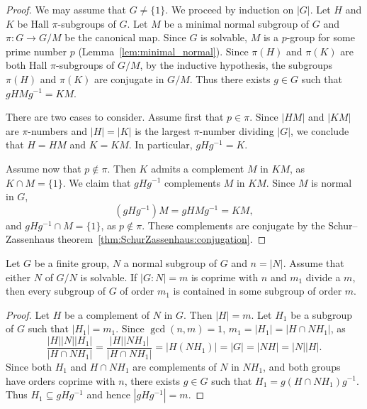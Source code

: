 \begin{proof}
	We may assume that $G\ne\{1\}$. We proceed by induction on $|G|$.  Let $H$
	and $K$ be Hall $\pi$-subgroups of $G$. Let $M$ be a minimal normal subgroup of 
    $G$ and $\pi\colon G\to G/M$ be the canonical map. Since $G$ is solvable, 
	$M$ is a $p$-group for some prime number $p$ (Lemma~\ref{lem:minimal_normal}). 
    Since $\pi(H)$ and $\pi(K)$ are both Hall 
	$\pi$-subgroups of $G/M$, by the inductive hypothesis, 
    the subgroups $\pi(H)$ and $\pi(K)$ are 
	conjugate in $G/M$. Thus there exists $g\in G$ such that $gHMg^{-1}=KM$. 

	There are two cases to consider. Assume first that $p\in\pi$. Since $|HM|$ and 
	$|KM|$ are $\pi$-numbers and $|H|=|K|$ is the largest $\pi$-number dividing $|G|$, 
    we conclude that $H=HM$ and $K=KM$. In particular, $gHg^{-1}=K$. 

	Assume now that $p\not\in\pi$. Then $K$ admits a complement $M$ in 
 	$KM$, as $K\cap M=\{1\}$. We claim that $gHg^{-1}$ complements $M$ in $KM$. Since 
	$M$ is normal in $G$, 
 	\[
	(gHg^{-1})M=gHMg^{-1}=KM,
	\]
	and $gHg^{-1}\cap M=\{1\}$, as $p\not\in\pi$. These complements are conjugate 
    by the Schur--Zassenhaus theorem~\ref{thm:SchurZassenhaus:conjugation}.
\end{proof}

\begin{corollary}
	Let $G$ be a finite group, $N$ a normal subgroup of $G$ and $n=|N|$. 
 	Assume that either $N$ of $G/N$ is solvable. 
    If $|G:N|=m$ is coprime with $n$ and 
    $m_1$ divide a $m$, then every subgroup of $G$ of order $m_1$ 
    is contained in some subgroup of order $m$. 
\end{corollary}

\begin{proof}
	Let $H$ be a complement of $N$ in $G$. Then $|H|=m$. Let $H_1$
	be a subgroup of $G$ such that $|H_1|=m_1$. 
	Since $\gcd(n,m)=1$, $m_1=|H_1|=|H\cap NH_1|$, as 
	\[
	\frac{|H||N||H_1|}{|H\cap NH_1|}=
	\frac{|H||NH_1|}{|H\cap NH_1|}=|H(NH_1)|=|G|=|NH|=|N||H|.
	\]
	Since both $H_1$ and $H\cap NH_1$ are complements of $N$ in $NH_1$, and both 
    groups have orders coprime with $n$, there exists 
	$g\in G$ such that $H_1=g(H\cap NH_1)g^{-1}$. Thus  
	$H_1\subseteq gHg^{-1}$ and hence $|gHg^{-1}|=m$. 
\end{proof}
